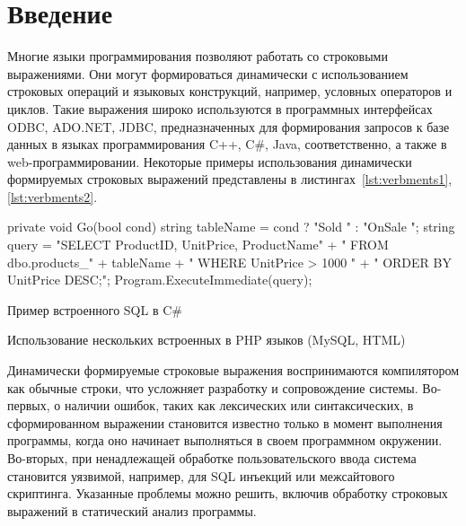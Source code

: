 \documentclass[10pt, conference, compsocconf]{IEEEtran}
\begin{document}
\section{Введение}
Многие языки программирования позволяют работать со строковыми выражениями. Они могут формироваться динамически с использованием строковых операций и языковых конструкций, например, условных операторов и циклов. Такие выражения широко используются в программных интерфейсах ODBC, ADO.NET, JDBC, предназначенных для формирования запросов к базе данных в языках программирования C++, C\#, Java, соответственно, а также в web-программировании. Некоторые примеры использования динамически формируемых строковых выражений представлены в листингах~\ref{lst:verbments1}, \ref{lst:verbments2}. 

\begin{listing}[h]
\begin{pyglist}[language=csharp,numbers=none,numbersep=5pt]
 private void Go(bool cond)
 {
   string tableName = cond ? "Sold " : "OnSale ";
   string query =
       "SELECT ProductID, UnitPrice, ProductName" 
           + " FROM dbo.products_" + tableName
           + " WHERE UnitPrice > 1000 "
           + " ORDER BY UnitPrice DESC;";
   Program.ExecuteImmediate(query);
 }
\end{pyglist}
\caption{Пример встроенного SQL в C\#}
\label{lst:verbments1}
\end{listing}


\begin{listing}[h]
\caption{Использование нескольких встроенных в PHP языков (MySQL, HTML)}
\label{lst:verbments2}
\end{listing}


Динамически формируемые строковые выражения воспринимаются компилятором как обычные строки, что усложняет разработку и сопровождение системы. Во-первых, о наличии ошибок, таких как лексических или синтаксических, в сформированном выражении становится известно только в момент выполнения программы, когда оно начинает выполняться в своем программном окружении. Во-вторых,  при ненадлежащей обработке пользовательского ввода система становится уязвимой, например, для SQL инъекций или межсайтового скриптинга. Указанные проблемы можно решить, включив обработку строковых выражений в статический анализ программы. 
\end{document}
